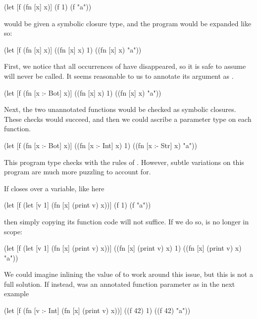 \begin{cljlisting}
(let [f (fn [x] x)]
  (f 1)
  (f "a"))
\end{cljlisting}

would be given a symbolic closure type, and
the program would be expanded like so:

\begin{cljlisting}
(let [f (fn [x] x)]
  ((fn [x] x) 1)
  ((fn [x] x) "a"))
\end{cljlisting}

First, we notice that all occurrences of  have disappeared,
so it is safe to assume  will never be called. It seems
reasonable to us to annotate its argument as .

\begin{cljlisting}
(let [f (fn [x :- Bot] x)]
  ((fn [x] x) 1)
  ((fn [x] x) "a"))
\end{cljlisting}

Next, the two unannotated functions would be checked as symbolic closures.
These checks would succeed, and then we could ascribe a parameter type on
each function.

\begin{cljlisting}
(let [f (fn [x :- Bot] x)]
  ((fn [x :- Int] x) 1)
  ((fn [x :- Str] x) "a"))
\end{cljlisting}

This program type checks with the rules of \ltiFsub.
However, subtle variations on this program are much
more puzzling to account for.

If  closes over a variable, like 
here

\begin{cljlisting}
(let [f (let [v 1] (fn [x] (print v) x))]
  (f 1)
  (f "a"))
\end{cljlisting}

then simply copying its function code will
not suffice.
If we do so,  is no longer in scope:

\begin{cljlisting}
(let [f (let [v 1] (fn [x] (print v) x))]
  ((fn [x] (print v) x) 1)
  ((fn [x] (print v) x) "a"))
\end{cljlisting}

We could imagine inlining the value of 
 to work around this issue, but this is not a
full solution.
If instead,  was an annotated function parameter
as in the next example

\begin{cljlisting}
(let [f (fn [v :- Int]
          (fn [x] (print v) x))]
  ((f 42) 1)
  ((f 42) "a"))
\end{cljlisting}

